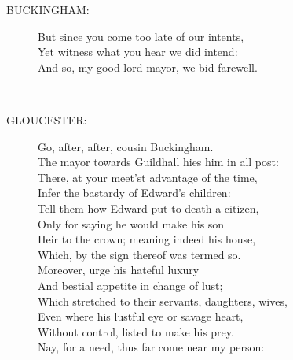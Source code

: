 \documentclass{article}
\begin{document}
\begin{description}
\item[BUCKINGHAM:] 
\hspace{1pt}But since you come too late of our intents,\\
\hspace{1pt}Yet witness what you hear we did intend:\\
\hspace{1pt}And so, my good lord mayor, we bid farewell.\\
\end{description}
\\
\begin{description}
\item[GLOUCESTER:] 
\hspace{1pt}Go, after, after, cousin Buckingham.\\
\hspace{1pt}The mayor towards Guildhall hies him in all post:\\
\hspace{1pt}There, at your meet'st advantage of the time,\\
\hspace{1pt}Infer the bastardy of Edward's children:\\
\hspace{1pt}Tell them how Edward put to death a citizen,\\
\hspace{1pt}Only for saying he would make his son\\
\hspace{1pt}Heir to the crown; meaning indeed his house,\\
\hspace{1pt}Which, by the sign thereof was termed so.\\
\hspace{1pt}Moreover, urge his hateful luxury\\
\hspace{1pt}And bestial appetite in change of lust;\\
\hspace{1pt}Which stretched to their servants, daughters, wives,\\
\hspace{1pt}Even where his lustful eye or savage heart,\\
\hspace{1pt}Without control, listed to make his prey.\\
\hspace{1pt}Nay, for a need, thus far come near my person:\\

\end{description}
\end{document}
